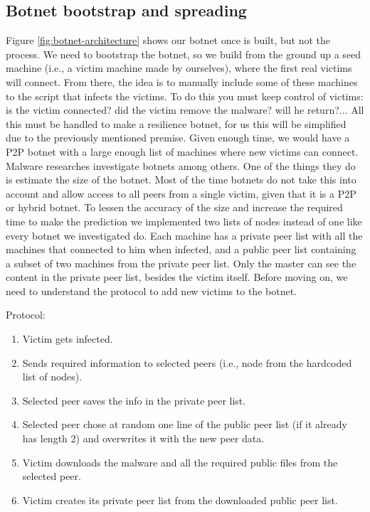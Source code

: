 \documentclass[11pt, a4paper,twoside]{tesi_upf}
\begin{document}
\subsection{Botnet bootstrap and spreading}
Figure \ref{fig:botnet-architecture} shows our botnet once is built, but not the process. We need to bootstrap the botnet, so we build from the ground up a seed machine (i.e., a victim machine made by ourselves), where the first real victims will connect. From there, the idea is to manually include some of these machines to the script that infects the victims. To do this you must keep control of victims: is the victim connected? did the victim remove the malware? will he return?... All this must be handled to make a resilience botnet, for us this will be simplified due to the previously mentioned premise. Given enough time, we would have a P2P botnet with a large enough list of machines where new victims can connect.
\newpage
Malware researches investigate botnets among others. One of the things they do is estimate the size of the botnet. Most of the time botnets do not take this into account and allow access to all peers from a single victim, given that it is a P2P or hybrid botnet. To lessen the accuracy of the size and increase the required time to make the prediction we implemented two lists of nodes instead of one like every botnet we investigated do. Each machine has a private peer list with all the machines that connected to him when infected, and a public peer list containing a subset of two machines from the private peer list. Only the master can see the content in the private peer list, besides the victim itself. Before moving on, we need to understand the protocol to add new victims to the botnet.

Protocol:
\begin{enumerate}
    \item Victim gets infected.
    \item Sends required information to selected peers (i.e., node from the hardcoded list of nodes).
    \item Selected peer saves the info in the private peer list.
    \item Selected peer chose at random one line of the public peer list (if it already has length 2) and overwrites it with the new peer data.
    \item Victim downloads the malware and all the required public files from the selected peer.
    \item Victim creates its private peer list from the downloaded public peer list.
\end{enumerate}
\end{document}
